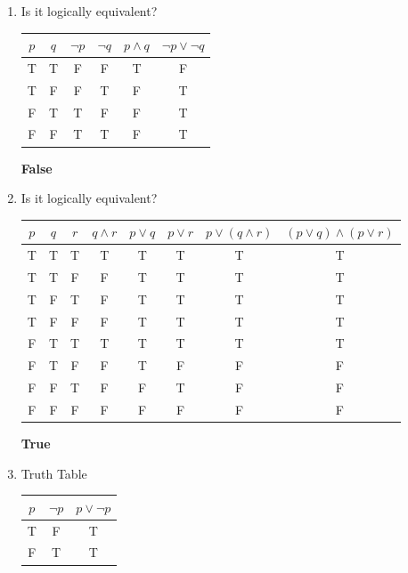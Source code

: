 \documentclass[letterpaper]{article}
\begin{document}
\begin{enumerate}
        \item Is it logically equivalent?
        
        \begin{tabular}{|c|c|c|c|c|c|}
            \hline
            $p$ & $q$ & $\neg p$ & $\neg q$ & $p \land q$& $\neg p \lor \neg q$\\ \hline
            T & T & F & F & T & F \\ \hline
            T & F & F & T & F & T \\ \hline
            F & T & T & F & F & T \\ \hline
            F & F & T & T & F & T \\ \hline
        \end{tabular}

        \textbf{False}


        \item Is it logically equivalent?
        
        \begin{tabular}{|c|c|c|c|c|c|c|c|}
            \hline
            $p$ & $q$ & $r$ & $q \land r$ & $p \lor q$ & $p \lor r$ & $p \lor (q \land r)$ & $(p \lor q)\land(p \lor r)$\\ \hline
            T & T & T & T & T & T & T & T \\ \hline
            T & T & F & F & T & T & T & T \\ \hline
            T & F & T & F & T & T & T & T \\ \hline
            T & F & F & F & T & T & T & T \\ \hline
            F & T & T & T & T & T & T & T \\ \hline
            F & T & F & F & T & F & F & F \\ \hline
            F & F & T & F & F & T & F & F \\ \hline
            F & F & F & F & F & F & F & F \\ \hline
        \end{tabular}

        \textbf{True}

        \item Truth Table

        \begin{tabular}{|c|c|c|}
            \hline
            $p$ & $\neg p$ & $p \lor \neg p$\\ \hline
            T & F & T \\ \hline
            F & T & T \\ \hline
        \end{tabular}


\end{enumerate}
\end{document}
